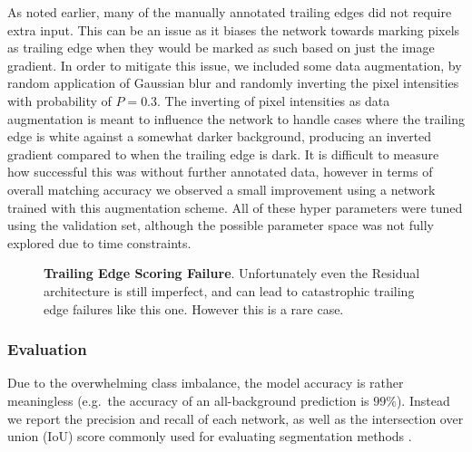 As noted earlier, many of the manually annotated trailing edges did not require extra input.
This can be an issue as it biases the network towards marking pixels as trailing edge when they would be marked as such based on just the image gradient.
In order to mitigate this issue, we included some data augmentation, by random application of Gaussian blur and randomly inverting the pixel intensities with probability of $P=0.3$.
The inverting of pixel intensities as data augmentation is meant to influence the network to handle cases where the trailing edge is white against a somewhat darker background, producing an inverted gradient compared to when the trailing edge is dark.
It is difficult to measure how successful this was without further annotated data, however in terms of overall matching accuracy we observed a small improvement using a network trained with this augmentation scheme.
All of these hyper parameters were tuned using the validation set, although the possible parameter space was not fully explored due to time constraints.

\begin{figure}[t]%
\centering
{}
\caption{\textbf{Trailing Edge Scoring Failure}. Unfortunately even the Residual architecture is still imperfect, and can lead to catastrophic trailing edge failures like this one. However this is a rare case.}
\label{fig:example_te_res_failure}
\end{figure}



\subsubsection{Evaluation}

Due to the overwhelming class imbalance, the model accuracy is rather meaningless (e.g.\ the accuracy of an all-background prediction is $99\%$).
Instead we report the precision and recall of each network, as well as the intersection over union (IoU) score commonly used for evaluating segmentation methods \cite{long2015fully}.

